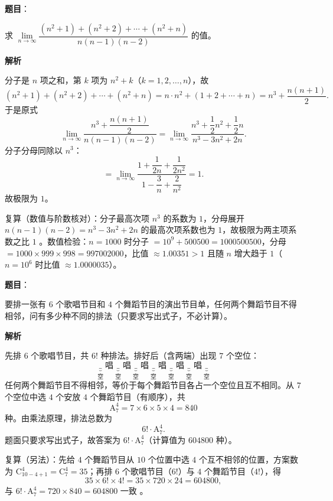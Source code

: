 \begin{answer}

\textbf{题目}：

求 $\lim\limits_{n\to\infty}\dfrac{(n^2+1)+(n^2+2)+\cdots+(n^2+n)}{n(n-1)(n-2)}$ 的值。

\textbf{解析}

分子是 $n$ 项之和，第 $k$ 项为 $n^2+k$（$k=1,2,\dots,n$），故
\nopagebreak[4]
\[
(n^2+1)+(n^2+2)+\cdots+(n^2+n)=n\cdot n^2+(1+2+\cdots+n)=n^3+\frac{n(n+1)}2.
\]
于是原式
\nopagebreak[4]
\[
\lim_{n\to\infty}\frac{n^3+\dfrac{n(n+1)}2}{n(n-1)(n-2)}
=\lim_{n\to\infty}\frac{n^3+\dfrac12n^2+\dfrac12n}{n^3-3n^2+2n}.
\]
分子分母同除以 $n^3$：
\nopagebreak[4]
\[
=\lim_{n\to\infty}\frac{1+\dfrac1{2n}+\dfrac1{2n^2}}{1-\dfrac3n+\dfrac2{n^2}}=1.
\]
故极限为 $1$。

复算（数值与阶数核对）：分子最高次项 $n^3$ 的系数为 $1$，分母展开 $n(n-1)(n-2)=n^3-3n^2+2n$ 的最高次项系数也为 $1$，故极限为两主项系数之比 $1$ 。数值检验：$n=1000$ 时分子 $=10^9+500500=1000500500$，分母 $=1000\times999\times998=997002000$，比值 $\approx1.00351>1$ 且随 $n$ 增大趋于 $1$（$n=10^6$ 时比值 $\approx1.0000035$）。


\end{answer}
\begin{answer}

\textbf{题目}：

要排一张有 $6$ 个歌唱节目和 $4$ 个舞蹈节目的演出节目单，任何两个舞蹈节目不得相邻，问有多少种不同的排法（只要求写出式子，不必计算）。

\textbf{解析}

先排 $6$ 个歌唱节目，共 $6!$ 种排法。排好后（含两端）出现 $7$ 个空位：
\nopagebreak[4]
\[
\underbrace{\_}_{\text{空}}\ \text{唱}\ \underbrace{\_}_{\text{空}}\ \text{唱}\ \underbrace{\_}_{\text{空}}\ \text{唱}\ \underbrace{\_}_{\text{空}}\ \text{唱}\ \underbrace{\_}_{\text{空}}\ \text{唱}\ \underbrace{\_}_{\text{空}}\ \text{唱}\ \underbrace{\_}_{\text{空}}
\]
任何两个舞蹈节目不得相邻，等价于每个舞蹈节目各占一个空位且互不相同。从 $7$ 个空位中选 $4$ 个安放 $4$ 个舞蹈节目（有顺序），共
\nopagebreak[4]
\[
\mathrm A_7^4=7\times6\times5\times4=840
\]
种。由乘法原理，排法总数为
\nopagebreak[4]
\[
6!\cdot\mathrm A_7^4.
\]
题面只要求写出式子，故答案为 $6!\cdot\mathrm A_7^4$（计算值为 $604800$ 种）。

复算（另法）：先给 $4$ 个舞蹈节目从 $10$ 个位置中选 $4$ 个互不相邻的位置，方案数为 $\mathrm C_{10-4+1}^{4}=\mathrm C_7^4=35$；再排 $6$ 个歌唱节目（$6!$）与 $4$ 个舞蹈节目（$4!$），得
\nopagebreak[4]
\[
35\times6!\times4!=35\times720\times24=604800,
\]
与 $6!\cdot\mathrm A_7^4=720\times840=604800$ 一致 。


\end{answer}
